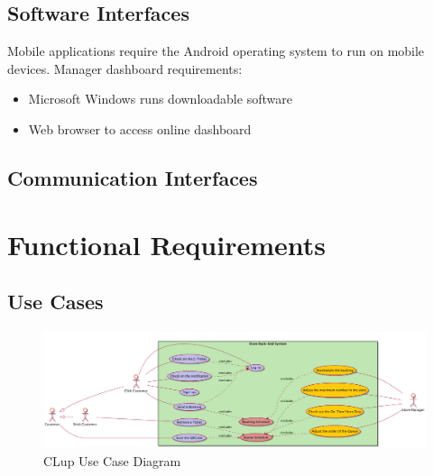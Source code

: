 \documentclass[a4paper,12pt]{report}
\begin{document}
\subsection{Software  Interfaces}
Mobile applications require the Android operating system to run on mobile devices.
Manager dashboard requirements:
\begin{itemize}
	\item Microsoft Windows runs downloadable software
	\item Web browser to access online dashboard
\end{itemize}

\subsection{Communication Interfaces}



\section{Functional Requirements}
\subsection{Use Cases}

\begin{figure}
	\includegraphics[angle=90,scale=0.17]{usecase_diagram.png}
	\centering
	\caption{CLup Use Case Diagram}
	\label{Use Case}
\end{figure}
\end{document}
